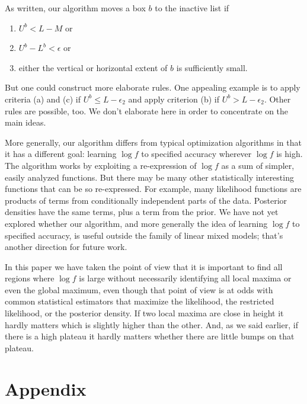 \documentclass{report}
\newcommand{\RL}{f}
\newcommand{\logRL}{\log\RL}
\begin{document}
As written, our algorithm moves a box $b$ to the inactive list if
\begin{enumerate}[label=(\alph*)]
\item $U^b < L-M$ or
\item $U^b - L^b < \epsilon$ or
\item either the vertical or horizontal extent of $b$ is sufficiently small.
\end{enumerate}
But one could construct more elaborate rules.  One appealing example is to apply criteria (a) and (c) if $U^b \le L-\epsilon_2$ and apply criterion (b) if $U^b > L-\epsilon_2$.  Other rules are possible, too.  We don't elaborate here in order to concentrate on the main ideas.

More generally, our algorithm differs from typical optimization algorithms in that it has a different goal: learning $\logRL$ to specified accuracy wherever $\logRL$ is high.  The algorithm works by exploiting a re-expression of $\logRL$ as a sum of simpler, easily analyzed functions.  But there may be many other statistically interesting functions that can be so re-expressed.  For example, many likelihood functions are products of terms from conditionally independent parts of the data.  Posterior densities have the same terms, plus a term from the prior.  We have not yet explored whether our algorithm, and more generally the idea of learning $\logRL$ to specified accuracy, is useful outside the family of linear mixed models; that's another direction for future work.

In this paper we have taken the point of view that it is important to find all regions where $\log f$ is large without necessarily identifying all local maxima or even the global maximum, even though that point of view is at odds with common statistical estimators that maximize the likelihood, the restricted likelihood, or the posterior density.  If two local maxima are close in height it hardly matters which is slightly higher than the other.  And, as we said earlier, if there is a high plateau it hardly matters whether there are little bumps on that plateau.

\section{Appendix}
\end{document}
